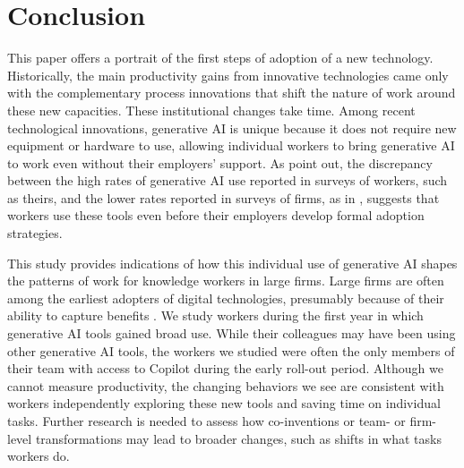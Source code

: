 \documentclass{article}
\begin{document}
\section{Conclusion}
\label{sec:conclusion}

This paper offers a portrait of the first steps of adoption of a new technology. Historically, the main productivity gains from innovative technologies came only with the complementary process innovations that shift the nature of work around these new capacities.  These institutional changes take time. Among recent technological innovations, generative AI is unique because it does not require new equipment or hardware to use, allowing individual workers to bring generative AI to work even without their employers' support. As \citet{blandin2024rapid} point out, the discrepancy between the high rates of generative AI use reported in surveys of workers, such as theirs, and the lower rates reported in surveys of firms, as in \citet{bonney2024tracking}, suggests that workers use these tools even before their employers develop formal adoption strategies.

This study provides indications of how this individual use of generative AI shapes the patterns of work for knowledge workers in large firms. Large firms are often among the earliest adopters of digital technologies, presumably because of their ability to capture benefits \citep{mcelheran2024ai}. We study workers during the first year in which generative AI tools gained broad use. While their colleagues may have been using other generative AI tools, the workers we studied were often the only members of their team with access to Copilot during the early roll-out period. Although we cannot measure productivity, the changing behaviors we see are consistent with workers independently exploring these new tools and saving time on individual tasks. Further research is needed to assess how co-inventions or team- or firm-level transformations may lead to broader changes, such as shifts in what tasks workers do.

\FloatBarrier
%
%


\end{document}

